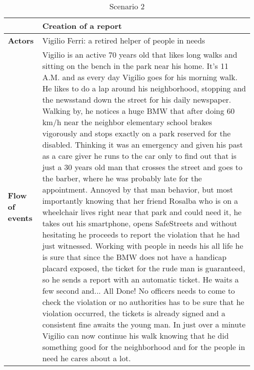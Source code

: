 \begin{table}[!htbp]
\centering
\begin{tabular}{lp{10.8cm}}
\hline
\bf\large  &\bf\large Creation of a report\\
\hline
\hline

\bf Actors&Vigilio Ferri: a retired helper of people in needs\\
\hline
\bf Flow of events&
Vigilio is an active 70 years old that likes long walks and sitting on the bench in the park near his home. It's 11 A.M. and as every day Vigilio goes for his morning walk. He likes to do a lap around his neighborhood, stopping and the newsstand down the street for his daily newspaper. Walking by, he notices a huge BMW that after doing 60 km/h near the neighbor elementary school brakes vigorously and stops exactly on a park reserved for the disabled. Thinking it was an emergency and given his past as a care giver he runs to the car only to find out that is just a 30 years old man that crosses the street and goes to the barber, where he was probably late for the appointment. Annoyed by that man behavior, but most importantly knowing that her friend Rosalba who is on a wheelchair lives right near that park and could need it, he takes out his smartphone, opens SafeStreets and without hesitating he proceeds to report the violation that he had just witnessed. Working with people in needs his all life he is sure that since the BMW does not have a handicap placard exposed, the ticket for the rude man is guaranteed, so he sends a report with an automatic ticket. He waits a few second and... All Done! No officers needs to come to check the violation or no authorities has to be sure that he violation occurred, the tickets is already signed and a consistent fine awaits the young man. In just over a minute Vigilio can now continue his walk knowing that he did something good for the neighborhood and for the people in need he cares about a lot.
\end{tabular}
\caption{Scenario 2} 
\label{tab:scenariotwo}
\end{table}
